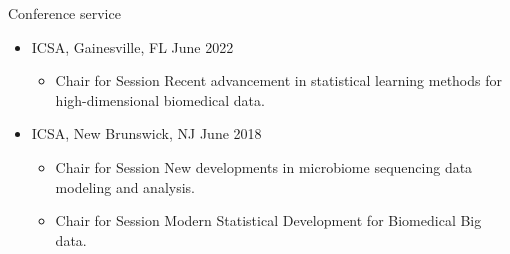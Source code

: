 \documentclass{resume} %
\begin{document}



\begin{rSection}{Conference service}

\begin{itemize}[noitemsep,topsep=0pt]
\item  ICSA, Gainesville, FL  \hfill {June 2022}
\begin{itemize}[noitemsep,topsep=0pt]
\item{Chair for Session Recent advancement in statistical learning methods for high-dimensional biomedical data.}
\end{itemize}


\item  ICSA, New Brunswick, NJ  \hfill {June 2018}
\begin{itemize}[noitemsep,topsep=0pt]
\item{Chair for Session New developments in microbiome sequencing data modeling and analysis.}
\item{Chair for Session Modern Statistical Development for Biomedical Big data.}
\end{itemize}


\end{itemize}

\end{rSection}
\end{document}
